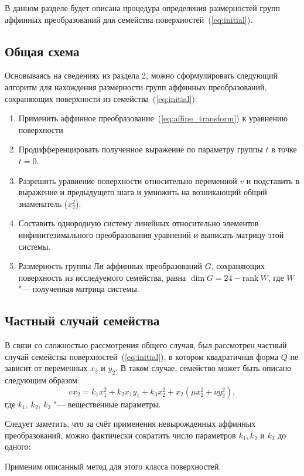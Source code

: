 \documentclass[../main.tex]{subfiles}
\begin{document}
В данном разделе будет описана процедура определения размерностей групп аффинных преобразований для семейства поверхностей~(\ref{eq:initial}).
\subsection{Общая схема}
Основываясь на сведениях из раздела 2, можно сформулировать следующий алгоритм для нахождения размерности групп аффинных преобразований, сохраняющих поверхности из семейства~(\ref{eq:initial}):
\begin{enumerate}
\item Применить аффинное преобразование~(\ref{eq:affine_transform}) к уравнению поверхности
\item Продифференцировать полученное выражение по параметру группы $t$ в точке $t = 0$.
\item Разрешить уравнение поверхности относительно переменной $v$ и подставить в выражение и предыдущего шага и умножить на возникающий общий знаменатель ($x_2^2$).
\item Составить однородную систему линейных относительно элементов инфинитезимального преобразования уравнений и выписать матрицу этой системы.
\item Размерность группы Ли аффинных преобразований $G$, сохраняющих поверхность из исследуемого семейства, равна $\dim G = 24 - \mathrm{rank}~W$, где $W$ "--- полученная матрица системы.
\end{enumerate}

\subsection{Частный случай семейства}
В связи со сложностью рассмотрения общего случая, был рассмотрен частный случай семейства поверхностей~(\ref{eq:initial}), в котором квадратичная форма $Q$ не зависит от переменных $x_2$ и $y_2$. В таком случае, семейство может быть описано следующим образом:
\begin{equation}\label{eq:special}
v x_2 = k_1 x_1^2 + k_2 x_1 y_1 + k_3 x_2^2 + x_2 (\mu x_2^2 + \nu y_2^2),
\end{equation}
где $k_1$, $k_2$, $k_3$ "--- вещественные параметры.

Следует заметить, что за счёт применения невырожденных аффинных преобразований, можно фактически сократить число параметров $k_1, k_2$ и $k_3$ до одного:

Применим описанный метод для этого класса поверхностей.
\end{document}
